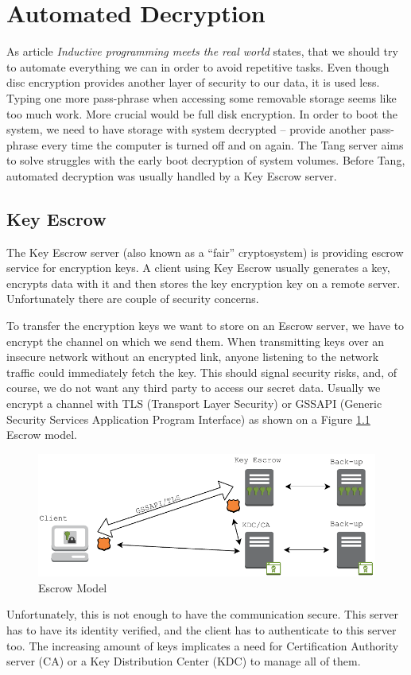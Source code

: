 \chapter{Automated Decryption}

As article {\it Inductive programming meets the real world} \cite{Gulwani2015} states, that we should try to automate everything we can in order to avoid repetitive tasks.
Even though disc encryption provides another layer of security to our data, it is used less.
Typing one more pass-phrase when accessing some removable storage seems like too much work.
More crucial would be full disk encryption.
In order to boot the system, we need to have storage with system decrypted -- provide another pass-phrase every time the computer is turned off and on again.
The Tang server aims to solve struggles with the early boot decryption of system volumes.
Before Tang, automated decryption was usually handled by a Key Escrow server.

\section{Key Escrow}\label{escrow}

The Key Escrow server (also known as a “fair” cryptosystem) is providing escrow service for encryption keys.
A client using Key Escrow usually generates a key, encrypts data with it and then stores the key encryption key on a remote server.
Unfortunately there are couple of security concerns.

To transfer the encryption keys we want to store on an Escrow server, we have to encrypt the channel on which we send them.
When transmitting keys over an insecure network without an encrypted link, anyone listening to the network traffic could immediately fetch the key.
This should signal security risks, and, of course, we do not want any third party to access our secret data.
Usually we encrypt a channel with TLS (Transport Layer Security) or GSSAPI (Generic Security Services Application Program Interface) as shown on a Figure \ref{fig_escrowmodel} Escrow model.
\begin{figure}[h]
    \centering
    \includegraphics[scale=0.7]{figures/EscrowModel.pdf}
    \caption{Escrow Model}
    \label{fig_escrowmodel}
\end{figure}
Unfortunately, this is not enough to have the communication secure.
This server has to have its identity verified, and the client has to authenticate to this server too.
The increasing amount of keys implicates a need for Certification Authority server (CA) or a Key Distribution Center (KDC) to manage all of them.

